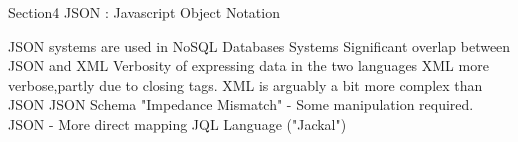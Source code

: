 Section4
JSON : Javascript Object Notation

JSON systems are used in NoSQL Databases Systems
Significant overlap between JSON and XML
Verbosity of expressing data in the two languages
 XML more verbose,partly due to closing tags.
XML is arguably a bit more complex than JSON
JSON Schema
"Impedance Mismatch" - Some manipulation required.
 JSON - More direct mapping
 JQL Language ("Jackal")
  
